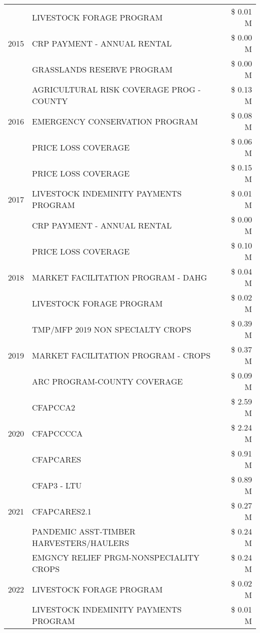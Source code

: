 \begin{tabular}{llr}
\cline{1-3}
\multirow[t]{3}{*}{2015} & LIVESTOCK FORAGE PROGRAM & \$ 0.01 M \\
 & CRP PAYMENT - ANNUAL RENTAL & \$ 0.00 M \\
 & GRASSLANDS RESERVE PROGRAM & \$ 0.00 M \\
\cline{1-3}
\multirow[t]{3}{*}{2016} & AGRICULTURAL RISK COVERAGE PROG - COUNTY & \$ 0.13 M \\
 & EMERGENCY CONSERVATION PROGRAM & \$ 0.08 M \\
 & PRICE LOSS COVERAGE & \$ 0.06 M \\
\cline{1-3}
\multirow[t]{3}{*}{2017} & PRICE LOSS COVERAGE & \$ 0.15 M \\
 & LIVESTOCK INDEMINITY PAYMENTS PROGRAM & \$ 0.01 M \\
 & CRP PAYMENT - ANNUAL RENTAL & \$ 0.00 M \\
\cline{1-3}
\multirow[t]{3}{*}{2018} & PRICE LOSS COVERAGE & \$ 0.10 M \\
 & MARKET FACILITATION PROGRAM - DAHG & \$ 0.04 M \\
 & LIVESTOCK FORAGE PROGRAM & \$ 0.02 M \\
\cline{1-3}
\multirow[t]{3}{*}{2019} & TMP/MFP 2019 NON SPECIALTY CROPS & \$ 0.39 M \\
 & MARKET FACILITATION PROGRAM - CROPS & \$ 0.37 M \\
 & ARC PROGRAM-COUNTY COVERAGE & \$ 0.09 M \\
\cline{1-3}
\multirow[t]{3}{*}{2020} & CFAPCCA2 & \$ 2.59 M \\
 & CFAPCCCCA & \$ 2.24 M \\
 & CFAPCARES & \$ 0.91 M \\
\cline{1-3}
\multirow[t]{3}{*}{2021} & CFAP3 - LTU & \$ 0.89 M \\
 & CFAPCARES2.1 & \$ 0.27 M \\
 & PANDEMIC ASST-TIMBER HARVESTERS/HAULERS & \$ 0.24 M \\
\cline{1-3}
\multirow[t]{3}{*}{2022} & EMGNCY RELIEF PRGM-NONSPECIALITY CROPS & \$ 0.24 M \\
 & LIVESTOCK FORAGE PROGRAM & \$ 0.02 M \\
 & LIVESTOCK INDEMINITY PAYMENTS PROGRAM & \$ 0.01 M \\
\cline{1-3}
\bottomrule
\end{tabular}
